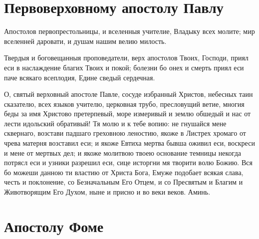 

\label{_content_obiscelenii-nedugov}

 


 

\section{Первоверховному апостолу Павлу}
 




Апостолов первопрестольницы, и вселенныя учителие, Владыку всех молите; мир вселенней даровати, и душам нашим велию милость.




Твердыя и боговещанныя проповедатели, верх апостолов Твоих, Господи, приял еси в наслаждение благих Твоих и покой; болезни бо онех и смерть приял еси паче всякаго всеплодия, Едине сведый сердечная.




О, святый верховный апостоле Павле, сосуде избранный Христов, небесных таин сказателю, всех языков учителю, церковная трубо, пресловущий ветие, многия беды за имя Христово претерпевый, море измеривый и землю обшедый и нас от лести идольский обративый! Тя молю и к тебе вопию: не гнушайся мене сквернаго, возстави падшаго греховною леностию, якоже в Листрех хромаго от чрева матерня возставил еси; и якоже Евтиха мертва бывша оживил еси, воскреси и мене от мертвых дел; и якоже молитвою твоею основание темницы некогда потрясл еси и узники разрешил еси, сице исторгни мя творити волю Божию. Вся бо можеши данною ти властию от Христа Бога, Емуже подобает всякая слава, честь и поклонение, со Безначальным Его Отцем, и со Пресвятым и Благим и Животворящим Его Духом, ныне и присно и во веки веков. Аминь.


\section{Апостолу Фоме}
 




